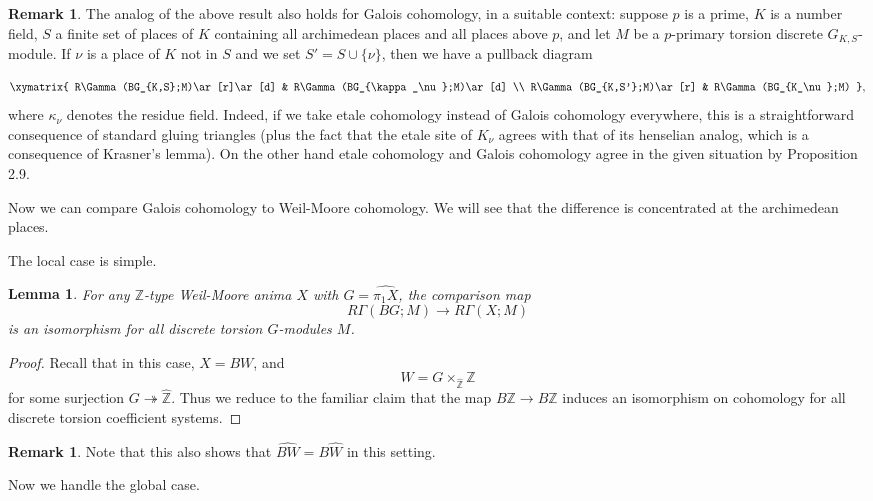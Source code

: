 \documentclass[12pt]{article}
\newtheorem{lemma}[theorem]{Lemma}
\theoremstyle{definition}
\newtheorem{remark}[theorem]{Remark}
\newcommand{\mbb}{\mathbb}
\newcommand{\wh}{\widehat}
\begin{document}
\begin{remark}\label{fillinpuncturegal}
The analog of the above result also holds for Galois cohomology, in a suitable context: suppose $p$ is a prime, $K$ is a number field, $S$ a finite set of places of $K$ containing all archimedean places and all places above $p$, and let $M$ be a $p$-primary torsion discrete $G_{K,S}$-module.  If $\nu$ is a place of $K$ not in $S$ and we set $S' = S\cup\{\nu\}$, then we have a pullback diagram

$$
\xymatrix{
R\Gamma(BG_{K,S};M)\ar[r]\ar[d] & R\Gamma(BG_{\kappa_\nu};M)\ar[d] \\
R\Gamma(BG_{K,S'};M)\ar[r] & R\Gamma(BG_{K_\nu};M) 
},$$ 
where $\kappa_\nu$ denotes the residue field.  Indeed, if we take etale cohomology instead of Galois cohomology everywhere, this is a straightforward consequence of standard gluing triangles (plus the fact that the etale site of $K_\nu$ agrees with that of its henselian analog, which is a consequence of Krasner's lemma).  On the other hand etale cohomology and Galois cohomology agree in the given situation by \cite{milneduality} Proposition 2.9.
\end{remark}

Now we can compare Galois cohomology to Weil-Moore cohomology.  We will see that the difference is concentrated at the archimedean places.

The local case is simple.

\begin{lemma}\label{nonarchcomp}
For any $\mbb{Z}$-type Weil-Moore anima $X$ with $G=\wh{\pi_1X}$, the comparison map
$$R\Gamma(BG;M) \to R\Gamma(X;M)$$
is an isomorphism for all discrete torsion $G$-modules $M$.
\end{lemma}
\begin{proof}
Recall that in this case, $X=BW$, and
$$W = G\times_{\wh{\mbb{Z}}}\mbb{Z}$$
for some surjection $G\twoheadrightarrow \wh{\mbb{Z}}$.  Thus we reduce to the familiar claim that the map $B\mbb{Z} \to B\wh{\mbb{Z}}$ induces an isomorphism on cohomology for all discrete torsion coefficient systems.
\end{proof}

\begin{remark}
Note that this also shows that $\wh{BW} = B\wh{W}$ in this setting.
\end{remark}

Now we handle the global case.
\end{document}
